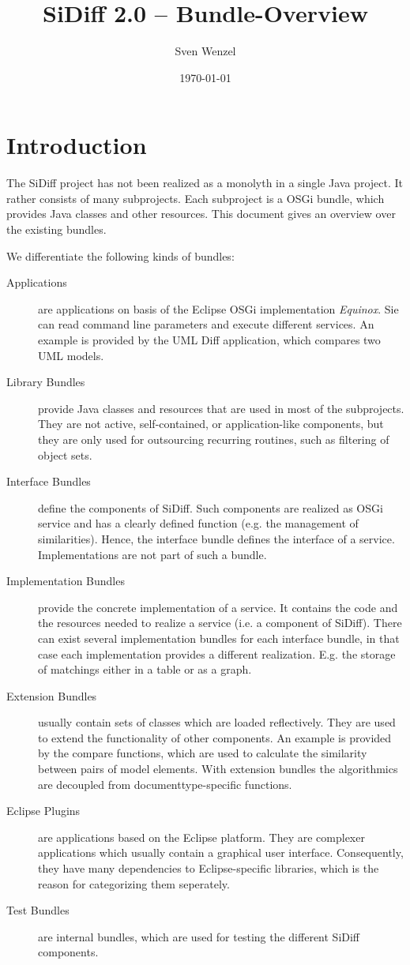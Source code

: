 \documentclass[10pt,a4paper]{scrartcl}
\title{SiDiff 2.0 -- Bundle-Overview}
\date{\today}
\author{Sven Wenzel}
\begin{document}
\maketitle
\tableofcontents
\newpage

\section{Introduction}
The SiDiff project has not been realized as a monolyth in a single Java project.
It rather consists of many subprojects. Each subproject is a OSGi bundle, which
provides Java classes and other resources. This document gives an overview over
the existing bundles.

We differentiate the following kinds of bundles:
\begin{description}
 \item [Applications] are applications on basis of the Eclipse OSGi implementation
\emph{Equinox}. Sie can read command line parameters and execute different services.
An example is provided by the UML Diff application, which compares two UML models.
 \item [Library Bundles] provide Java classes and resources that are used in most 
of the subprojects. They are not active, self-contained, or application-like components,
but they are only used for outsourcing recurring routines, such as filtering of
object sets.
 \item [Interface Bundles] define the components of SiDiff. Such components are realized
as OSGi service and has a clearly defined function (e.g. the management of similarities).
Hence, the interface bundle defines the interface of a service. Implementations are not 
part of such a bundle.
 \item [Implementation Bundles] provide the concrete implementation of a service. It
contains the code and the resources needed to realize a service (i.e. a component of
SiDiff). There can exist several implementation bundles for each interface bundle,
in that case each implementation provides a different realization. E.g. the storage
of matchings either in a table or as a graph.
 \item [Extension Bundles] usually contain sets of classes which are loaded reflectively.
They are used to extend the functionality of other components. An example is provided
by the compare functions, which are used to calculate the similarity between pairs of
model elements. With extension bundles the algorithmics are decoupled from documenttype-specific
functions.
 \item [Eclipse Plugins] are applications based on the Eclipse platform. They are 
complexer applications which usually contain a graphical user interface. Consequently,
they have many dependencies to Eclipse-specific libraries, which is the reason for
categorizing them seperately.
 \item [Test Bundles] are internal bundles, which are used for testing the different
SiDiff components.
\end{description}
\end{document}
